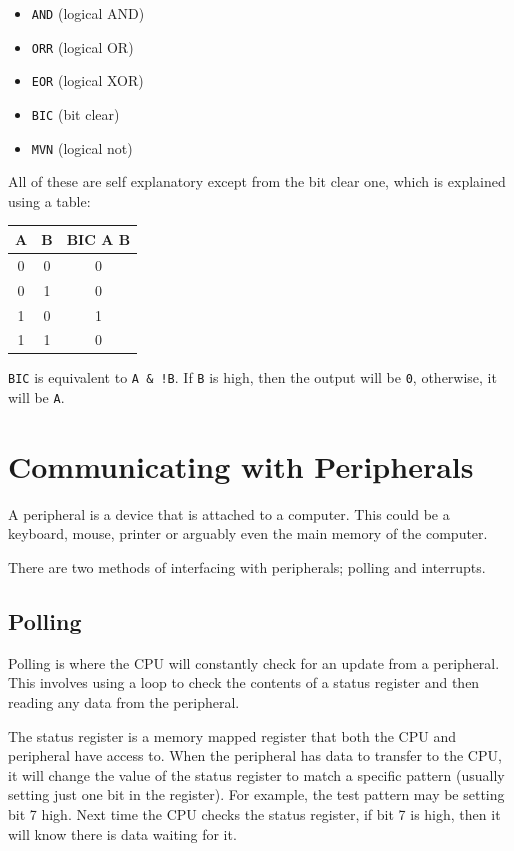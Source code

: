 \begin{itemize}

	\item {\tt AND} (logical AND)
	\item {\tt ORR} (logical OR)
	\item {\tt EOR} (logical XOR)
	\item {\tt BIC} (bit clear)
	\item {\tt MVN} (logical not)

\end{itemize}

All of these are self explanatory except from the bit clear one, which is
explained using a table:

\begin{center}
	\begin{tabular}{|c|c|c}
		A & B & BIC A B\\ \hline
		0 & 0 & 0\\
		0 & 1 & 0\\
		1 & 0 & 1\\
		1 & 1 & 0\\
	\end{tabular}
\end{center}

{\tt BIC} is equivalent to {\tt A \& !B}. If {\tt B} is high, then the output will
be {\tt 0}, otherwise, it will be {\tt A}.

\section{Communicating with Peripherals}

A peripheral is a device that is attached to a computer. This could be a
keyboard, mouse, printer or arguably even the main memory of the computer.

There are two methods of interfacing with peripherals; polling and interrupts.

\subsection{Polling}

Polling is where the CPU will constantly check for an update from a peripheral.
This involves using a loop to check the contents of a status register and then
reading any data from the peripheral.

The status register is a memory mapped register that both the CPU and peripheral
have access to. When the peripheral has data to transfer to the CPU, it will
change the value of the status register to match a specific pattern (usually
setting just one bit in the register). For example, the test pattern may be
setting bit 7 high. Next time the CPU checks the status register, if bit 7 is
high, then it will know there is data waiting for it.


